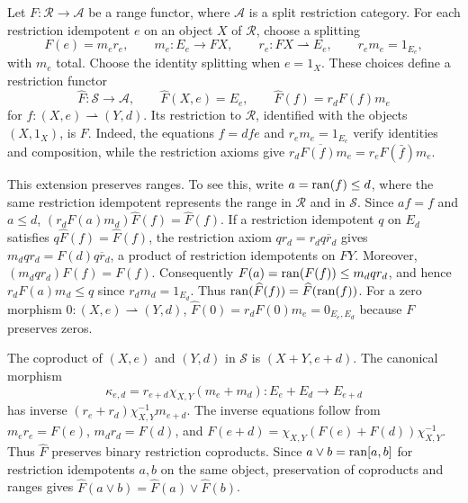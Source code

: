 Let $F:\mathscr R\to\mathcal A$ be a range functor, where
$\mathcal A$ is a split restriction category. For each restriction
idempotent $e$ on an object $X$ of $\mathscr R$, choose a splitting
\[
 F(e)=m_e r_e,\qquad
 m_e:E_e\to FX,\qquad r_e:FX\rightharpoonup E_e,\qquad
 r_e m_e=1_{E_e},
\]
with $m_e$ total. Choose the identity splitting when $e=1_X$.
These choices define a restriction functor
\[
 \widehat F:\mathscr S\longrightarrow\mathcal A,\qquad
 \widehat F(X,e)=E_e,\qquad
 \widehat F(f)=r_d F(f)m_e
\]
for $f:(X,e)\rightharpoonup(Y,d)$. Its restriction to
$\mathscr R$, identified with the objects $(X,1_X)$, is $F$.
Indeed, the equations $f=dfe$ and $r_e m_e=1_{E_e}$ verify
identities and composition, while the restriction axioms give
$\overline{r_d F(f)m_e}=r_e F(\bar f)m_e$.

This extension preserves ranges. To see this, write
$a=\operatorname{ran}(f)\le d$, where the same restriction idempotent represents
the range in $\mathscr R$ and in $\mathscr S$.
Since $af=f$ and $a\le d$,
$(r_d F(a)m_d)\widehat F(f)=\widehat F(f)$.
If a restriction idempotent $q$ on $E_d$ satisfies
$q\widehat F(f)=\widehat F(f)$, the restriction axiom
$q r_d=r_d\overline{q r_d}$ gives
$m_d q r_d=F(d)\overline{q r_d}$, a product of restriction idempotents
on $FY$. Moreover, $(m_d q r_d)F(f)=F(f)$. Consequently
$F(a)=\operatorname{ran}(F(f))\le m_d q r_d$, and hence
$r_d F(a)m_d\le q$ since $r_d m_d=1_{E_d}$. Thus
$\operatorname{ran}(\widehat F(f))=\widehat F(\operatorname{ran}(f))$.
For a zero morphism $0:(X,e)\rightharpoonup(Y,d)$,
$\widehat F(0)=r_d F(0)m_e=0_{E_e,E_d}$ because $F$ preserves zeros.

The coproduct of $(X,e)$ and $(Y,d)$ in $\mathscr S$ is
$(X+Y,e+d)$. The canonical morphism
\[
 \kappa_{e,d}=r_{e+d}\chi_{X,Y}(m_e+m_d):
 E_e+E_d\longrightarrow E_{e+d}
\]
has inverse
$(r_e+r_d)\chi_{X,Y}^{-1}m_{e+d}$. The inverse equations follow
from $m_e r_e=F(e)$, $m_d r_d=F(d)$, and
$F(e+d)=\chi_{X,Y}(F(e)+F(d))\chi_{X,Y}^{-1}$.
Thus $\widehat F$ preserves binary restriction coproducts.
Since $a\vee b=\operatorname{ran}[a,b]$ for restriction idempotents $a,b$ on
the same object, preservation of coproducts and ranges gives
$\widehat F(a\vee b)=\widehat F(a)\vee\widehat F(b)$.

